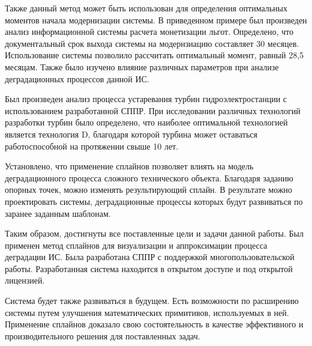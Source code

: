 Также данный метод может быть использован для определения оптимальных моментов начала модернизации системы.
В приведенном примере был произведен анализ информационной системы расчета монетизации льгот.
Определено, что документальный срок выхода системы на модернзиацию составляет 30 месяцев.
Использование системы позволило рассчитать оптимальный момент, равный 28,5 месяцам.
Также было изучено влияние различных параметров при анализе деградационных процессов данной ИС.

Был произведен анализ процесса устаревания турбин гидроэлектростанции с использованием разработанной СППР.
При исследовании различных технологий разработки турбин было определено, что наиболее оптимальной технологией является технология D,
благодаря которой турбина может оставаться работоспособной на протяжении свыше 10 лет.

Установлено, что применение сплайнов позволяет влиять на модель деградационного процесса сложного технического объекта.
Благодаря заданию опорных точек, можно изменять результирующий сплайн.
В результате можно проектировать системы, деградационные процессы которых будут развиваться по заранее заданным шаблонам.

Таким образом, достигнуты все поставленные цели и задачи данной работы. 
Был применен метод сплайнов для визуализации и аппроксимации процесса деградации ИС. 
Была разработана СППР с поддержкой многопользовательской работы. 
Разработанная система находится в открытом доступе и под открытой лицензией.


Система будет также развиваться в будущем. 
Есть возможности по расширению системы путем улучшения математических примитивов, используемых в ней.  
Применение сплайнов доказало свою состоятельность в качестве эффективного и производительного решения для поставленных задач.




